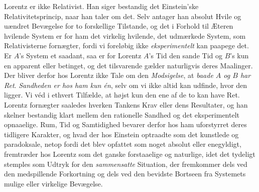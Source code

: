 \documentclass[12pt,a4paper]{article}
\begin{document}
Lorentz er ikke Relativist. Han siger bestandig \guillemotright det
Einstein'ske Relativitetsprincip\guillemotleft, naar han taler om det. Selv
antager han absolut Hvile og uændret Bevægelse for to forskellige Tilstande, og
det i Forhold til Æteren hvilende System er for ham det virkelig hvilende, det
\guillemotright udmærkede\guillemotleft{} System, som Relativisterne fornægter,
fordi vi foreløbig ikke \emph{eksperimentelt} kan paapege det. Er $A$'s System
et saadant, saa er for Lorentz $A$'s Tid den sande Tid og $B$'s kun en
apparent eller betinget, og det tilsvarende gælder naturligvis deres
Maalinger. Der bliver derfor hos Lorentz ikke Tale om den \emph{Modsigelse},
at \emph{baade $A$ og $B$ har Ret}. \emph{Sandheden er hos ham kun én}, selv om
vi ikke altid kan udfinde, hvor den ligger. Vi véd i ethvert Tilfælde, at højst
kun den ene af de to kan have Ret. Lorentz fornægter saaledes hverken Tankens
Krav eller dens Resultater, og han skelner bestandig klart mellem den rationelle
Sandhed og det eksperimentelt opnaaelige. Rum, Tid og Samtidighed bevarer
derfor hos ham uforstyrret deres tidligere Karakter, og hvad der hos Einstein
optraadte som det kunstlede og paradoksale, netop fordi det blev opfattet som
noget absolut eller enegyldigt, fremtræder hos Lorentz som det ganske
forstaaelige og naturlige, idet det tydeligt stemples som Udtryk for den
\emph{sammensatte} Situation, der fremkommer dels ved den medspillende
Forkortning og dels ved den bevidste Bortseen fra Systemets mulige eller
virkelige Bevægelse.
\end{document}
